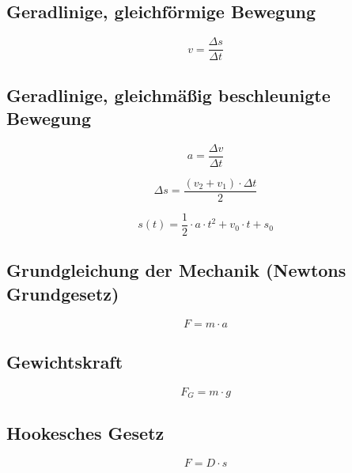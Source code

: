 
\subsection{Geradlinige, gleichförmige Bewegung}
\begin{equation}\label{eq:mechanik:geradlinige:gleichfoermige:bewegung:v}
v = \frac{\Delta s}{\Delta t}
\end{equation}

\subsection{Geradlinige, gleichmäßig beschleunigte Bewegung}
\begin{equation}\label{eq:mechanik:geradlinige:gleichmaessig:beschleunigte:bewegung:a}
a = \frac{\Delta v}{\Delta t}
\end{equation}

\begin{equation}\label{eq:mechanik:geradlinige:gleichmaessig:beschleunigte:bewegung:s:v}
\Delta s = \frac{(v_2 + v_1) \cdot \Delta t}{2}
\end{equation}  

\begin{equation}\label{eq:mechanik:geradlinige:gleichmaessig:beschleunigte:bewegung:s:a}
s(t) = \frac{1}{2}\cdot a\cdot t^2 + v_0 \cdot t + s_0
\end{equation}

\subsection{Grundgleichung der Mechanik (Newtons Grundgesetz)}
\begin{equation}\label{eq:mechanik:grundgleichung}
 F = m \cdot a
\end{equation}

\subsection{Gewichtskraft}
\begin{equation}\label{eq:mechanik:gewichtskraft}
 F_G = m \cdot g
\end{equation}

\subsection{Hookesches Gesetz}
\begin{equation}\label{eq:mechanik:hookesches:gesetz}
 F = D \cdot s
\end{equation}

